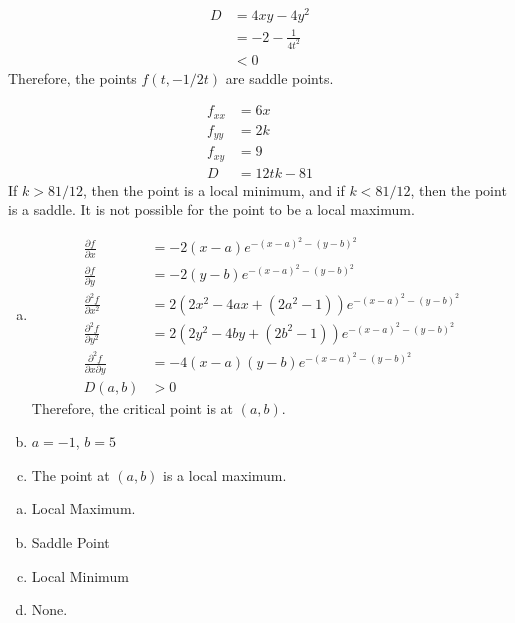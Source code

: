 \documentclass[8pt]{extarticle}
\begin{document}
\begin{problem}{15.1}
\begin{description}[font=\normalfont]
\begin{align*}
          D &= 4xy-4y^2\\
            &= -2 - \frac{1}{4t^2}\\
            &< 0
        \end{align*}
        Therefore, the points $f(t,-1/2t)$ are saddle points.
      \item[28:]
        \begin{align*}
          f_{xx} &= 6x\\
          f_{yy} &= 2k\\
          f_{xy} &= 9\\
          D &= 12tk - 81
        \end{align*}
        If $k > 81/12$, then the point is a local minimum, and if $k < 81/12$, then the point is a saddle. It is not possible for the point to be a local maximum.
      \item[32:]
        \begin{enumerate}[(a)]
          \item 
            \begin{align*}
              \frac{\partial f}{\partial x} &= -2(x-a)e^{-(x-a)^2 - (y-b)^2}\\
              \frac{\partial f}{\partial y} &= -2(y-b)e^{-(x-a)^2 - (y-b)^2}\\
              \frac{\partial^2f}{\partial x^2} &= 2\left(2x^2-4ax+(2a^2-1)\right)e^{-(x-a)^2 - (y-b)^2}\\
              \frac{\partial^2f}{\partial y^2} &= 2\left(2y^2-4by+(2b^2-1)\right)e^{-(x-a)^2 - (y-b)^2}\\
              \frac{\partial^2f}{\partial x\partial y} &= -4(x-a)(y-b)e^{-(x-a)^2 - (y-b)^2}\\
              D(a,b) &>0
            \end{align*}
            Therefore, the critical point is at $(a,b)$.
          \item $a=-1$, $b=5$
          \item The point at $(a,b)$ is a local maximum.
        \end{enumerate}
      \item[34:]
        \begin{enumerate}[(a)]
          \item Local Maximum.
          \item Saddle Point
          \item Local Minimum
          \item None.
        \end{enumerate}
      \item[38:]
      \item[42:]
    \end{description}
  \end{problem}
\end{document}
